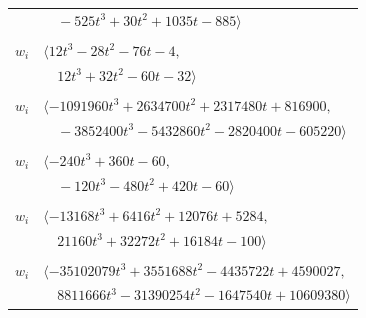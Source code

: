 \documentclass[11pt]{article}
\begin{document}
\begin{longtable}{@{}ll@{}}
 & $\quad -525t^{3}+30t^{2}+1035t-885\rangle$\\
\addlinespace[2pt]
\multicolumn{2}{@{}p{0.97\textwidth}@{}}{$i=39$, $D_i=2$, $\rho_{ij}$: $17{:}2, \allowbreak 38{:}1, \allowbreak 52{:}1, \allowbreak 56{:}2$}\\
$w_i$ & $\langle 12t^{3}-28t^{2}-76t-4,$\\
 & $\quad 12t^{3}+32t^{2}-60t-32\rangle$\\
\addlinespace[2pt]
\multicolumn{2}{@{}p{0.97\textwidth}@{}}{$i=40$, $D_i=16$, $\rho_{ij}$: $2{:}1, \allowbreak 3{:}1, \allowbreak 4{:}1, \allowbreak 6{:}1, \allowbreak 7{:}1, \allowbreak 16{:}1, \allowbreak 20{:}1, \allowbreak 22{:}2, \allowbreak 24{:}2, \allowbreak 28{:}2, \allowbreak 29{:}1, \allowbreak 31{:}1, \allowbreak 32{:}2, \allowbreak 36{:}2, \allowbreak 42{:}1, \allowbreak 48{:}1, \allowbreak 51{:}2, \allowbreak 56{:}2$}\\
$w_i$ & $\langle -1091960t^{3}+2634700t^{2}+2317480t+816900,$\\
 & $\quad -3852400t^{3}-5432860t^{2}-2820400t-605220\rangle$\\
\addlinespace[2pt]
\multicolumn{2}{@{}p{0.97\textwidth}@{}}{$i=41$, $D_i=8$, $\rho_{ij}$: $17{:}1, \allowbreak 18{:}1, \allowbreak 27{:}2, \allowbreak 28{:}2, \allowbreak 50{:}2, \allowbreak 58{:}1$}\\
$w_i$ & $\langle -240t^{3}+360t-60,$\\
 & $\quad -120t^{3}-480t^{2}+420t-60\rangle$\\
\addlinespace[2pt]
\multicolumn{2}{@{}p{0.97\textwidth}@{}}{$i=42$, $D_i=8$, $\rho_{ij}$: $10{:}2, \allowbreak 11{:}2, \allowbreak 15{:}1, \allowbreak 24{:}1, \allowbreak 25{:}2, \allowbreak 32{:}2, \allowbreak 40{:}2, \allowbreak 47{:}2, \allowbreak 49{:}1$}\\
$w_i$ & $\langle -13168t^{3}+6416t^{2}+12076t+5284,$\\
 & $\quad 21160t^{3}+32272t^{2}+16184t-100\rangle$\\
\addlinespace[2pt]
\multicolumn{2}{@{}p{0.97\textwidth}@{}}{$i=43$, $D_i=228$, $e_i=2$, $\rho_{ij}$: $0{:}1, \allowbreak 6{:}1, \allowbreak 10{:}1, \allowbreak 11{:}1, \allowbreak 14{:}1, \allowbreak 16{:}2, \allowbreak 21{:}1, \allowbreak 27{:}1, \allowbreak 32{:}2, \allowbreak 33{:}1, \allowbreak 34{:}1, \allowbreak 45{:}2, \allowbreak 52{:}2, \allowbreak 57{:}2$}\\
$w_i$ & $\langle -35102079t^{3}+3551688t^{2}-4435722t+4590027,$\\
 & $\quad 8811666t^{3}-31390254t^{2}-1647540t+10609380\rangle$\\

\end{longtable}
\end{document}
